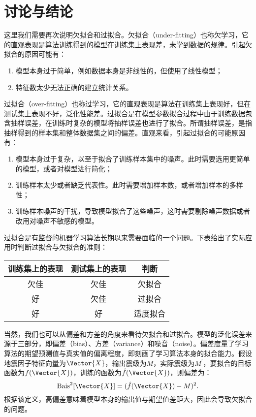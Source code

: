 \section{讨论与结论}\label{sec:seis_conclusion}

这里我们需要再次说明欠拟合和过拟合。欠拟合（under-fitting）也称欠学习，它的直观表现是算法训练得到的模型在训练集上表现差，未学到数据的规律。引起欠拟合的原因可能有：
\begin{enumerate}
    \item 模型本身过于简单，例如数据本身是非线性的，但使用了线性模型；
    \item 特征数太少无法正确的建立统计关系。
\end{enumerate}

过拟合（over-fitting）也称过学习，它的直观表现是算法在训练集上表现好，但在测试集上表现不好，泛化性能差。过拟合是在模型参数拟合过程中由于训练数据包含抽样误差，在训练时复杂的模型将抽样误差也进行了拟合。所谓抽样误差，是指抽样得到的样本集和整体数据集之间的偏差。直观来看，引起过拟合的可能原因有：
\begin{enumerate}
    \item 模型本身过于复杂，以至于拟合了训练样本集中的噪声。此时需要选用更简单的模型，或者对模型进行简化；
    \item 训练样本太少或者缺乏代表性。此时需要增加样本数，或者增加样本的多样性；
    \item 训练样本噪声的干扰，导致模型拟合了这些噪声，这时需要剔除噪声数据或者改用对噪声不敏感的模型。
\end{enumerate}

过拟合是有监督的机器学习算法长期以来需要面临的一个问题。下表给出了实际应用时判断过拟合与欠拟合的准则：
\begin{table}[!htbp]
    \label{tab:seism_overfit}
    \centering
    \footnotesize
    \begin{tabular}{ccc}
        \toprule
        训练集上的表现 & 测试集上的表现 & 判断 \\
        \midrule
        欠佳 & 欠佳 & 欠拟合 \\
        好 & 欠佳 & 过拟合 \\
        好 & 好 & 适度拟合 \\
        \bottomrule
    \end{tabular}
\end{table}

当然，我们也可以从偏差和方差的角度来看待欠拟合和过拟合。模型的泛化误差来源于三部分，即偏差（bias）、方差（variance）和噪音（noise）。偏差度量了学习算法的期望预测值与真实值的偏离程度，即刻画了学习算法本身的拟合能力。假设地震因子特征向量为$\Vector{X}$，输出震级为$M$，实际震级为$M^{\prime}$，要拟合的目标函数为$f(\Vector{X})$，训练的函数为$\hat{f}(\Vector{X})$，则偏差为：
\begin{equation}
  \mathrm{Bais}^2[\Vector{X}]=(\hat{f}(\Vector{X})-M)^2.
\end{equation}
根据该定义，高偏差意味着模型本身的输出值与期望值差距大，因此会导致欠拟合的问题。

